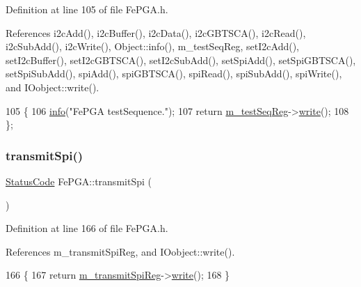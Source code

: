 Definition at line 105 of file Fe\+P\+G\+A.\+h.



References i2c\+Add(), i2c\+Buffer(), i2c\+Data(), i2c\+G\+B\+T\+S\+C\+A(), i2c\+Read(), i2c\+Sub\+Add(), i2c\+Write(), Object\+::info(), m\+\_\+test\+Seq\+Reg, set\+I2c\+Add(), set\+I2c\+Buffer(), set\+I2c\+G\+B\+T\+S\+C\+A(), set\+I2c\+Sub\+Add(), set\+Spi\+Add(), set\+Spi\+G\+B\+T\+S\+C\+A(), set\+Spi\+Sub\+Add(), spi\+Add(), spi\+G\+B\+T\+S\+C\+A(), spi\+Read(), spi\+Sub\+Add(), spi\+Write(), and I\+Oobject\+::write().


\begin{DoxyCode}
105                             \{
106     \hyperlink{classObject_a644fd329ea4cb85f54fa6846484b84a8}{info}(\textcolor{stringliteral}{"FePGA testSequence."});
107     \textcolor{keywordflow}{return} \hyperlink{classFePGA_a67bc3c8f923b673100974fd86096393e}{m\_testSeqReg}->\hyperlink{classIOobject_a9f6984bc9f0fadcf800f1be2523ac744}{write}();
108   \};
\end{DoxyCode}
\mbox{\label{classFePGA_ac7698a9f59f7290a6bb648030976597f}} 
\subsubsection{\texorpdfstring{transmit\+Spi()}{transmitSpi()}}
{\footnotesize\ttfamily \hyperlink{classStatusCode}{Status\+Code} Fe\+P\+G\+A\+::transmit\+Spi (\begin{DoxyParamCaption}{ }\end{DoxyParamCaption})\hspace{0.3cm}{\ttfamily [inline]}}



Definition at line 166 of file Fe\+P\+G\+A.\+h.



References m\+\_\+transmit\+Spi\+Reg, and I\+Oobject\+::write().


\begin{DoxyCode}
166                            \{
167     \textcolor{keywordflow}{return} \hyperlink{classFePGA_a003ee241fb5f32fb3442174db3fe6f49}{m\_transmitSpiReg}->\hyperlink{classIOobject_a9f6984bc9f0fadcf800f1be2523ac744}{write}();
168   \}
\end{DoxyCode}
\mbox{\label{classFePGA_ad23605ae261d2aa0562cbb732661b2c4}} 
